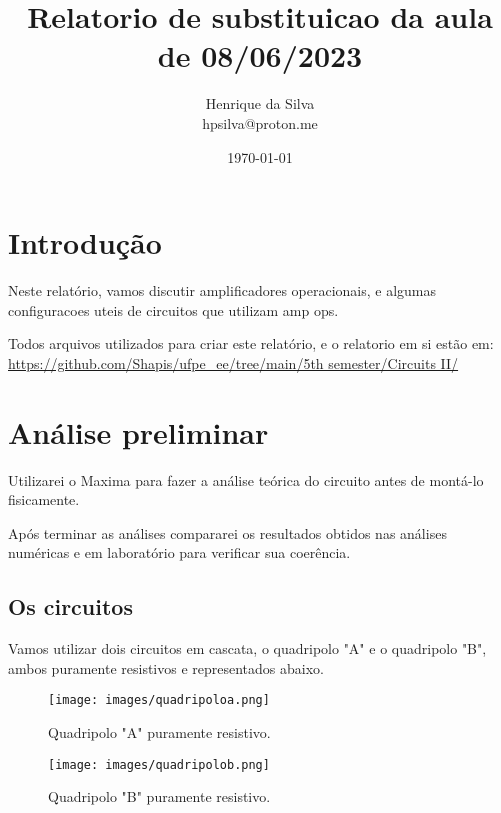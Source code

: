 \documentclass[12pt,twoside, a4paper, twocolumn]{article}
\title{Relatorio de substituicao da aula de 08/06/2023}
\author{Henrique da Silva \\ hpsilva@proton.me}
\date{\today}
\begin{document}
\maketitle
{}
\newpage
\tableofcontents
\newpage

\section{Introdução}

Neste relatório, vamos discutir amplificadores operacionais, e algumas configuracoes uteis de circuitos que utilizam amp ops.

Todos arquivos utilizados para criar este relatório, e o relatorio em si estão em:  \url{https://github.com/Shapis/ufpe_ee/tree/main/5th semester/Circuits II/}




\section{Análise preliminar}




Utilizarei o Maxima para fazer a análise teórica do circuito antes de montá-lo fisicamente.


Após terminar as análises compararei os resultados obtidos nas análises numéricas e em laboratório para verificar sua coerência.




\subsection{Os circuitos}


Vamos utilizar dois circuitos em cascata, o quadripolo "A" e o quadripolo "B", ambos puramente resistivos e representados abaixo.




\begin{figure}[h]
    \centering
    \texttt{[image: images/quadripoloa.png]}
    \caption{Quadripolo "A" puramente resistivo.}
\end{figure}


\begin{figure}[h]
    \centering
    \texttt{[image: images/quadripolob.png]}
    \caption{Quadripolo "B" puramente resistivo.}
\end{figure}




\pagebreak
\end{document}
